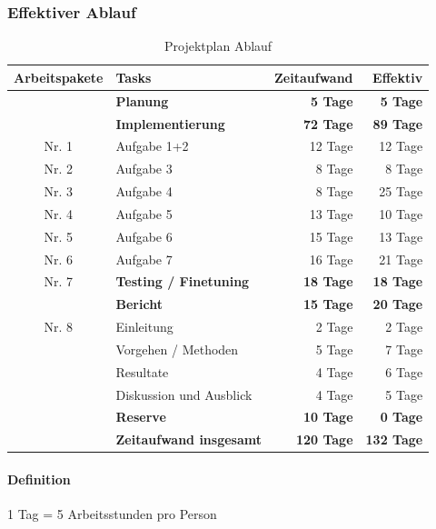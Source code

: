 \documentclass[a4paper,10pt]{article}
\begin{document}
\subsubsection{Effektiver Ablauf}
\begin{table}[h!]
\centering 
  \begin{tabular}{| c | l | r | >{\color{red}} r |}
    \hline
    \rowcolor{hellgrau} 
    \textbf{Arbeitspakete} & \textbf{Tasks} & \textbf{Zeitaufwand} & \textbf{\color{black}Effektiv} \\ \hline \hline
    \multirow{1}{*}{} & \textbf{Planung} & \textbf{ 5 Tage} & \textbf{ 5 Tage}  \\ \cline{2-4} \hline \hline
     & \textbf{Implementierung} & \textbf{ 72 Tage} & \textbf{ 89 Tage}  \\ \hline
     \multirow{1}{*}{Nr. 1}& Aufgabe 1+2 & 12 Tage & 12 Tage \\ \hline
     Nr. 2 & Aufgabe 3 & 8 Tage & 8 Tage \\ \hline
     Nr. 3& Aufgabe 4 & 8 Tage & 25 Tage \\ \hline
     Nr. 4& Aufgabe 5 & 13 Tage & 10 Tage \\ \hline
     Nr. 5& Aufgabe 6 & 15 Tage & 13 Tage \\ \hline
     Nr. 6& Aufgabe 7 & 16 Tage & 21 Tage \\ \cline{2-4}\hline \hline
     Nr. 7& \textbf{Testing / Finetuning} & \textbf{ 18 Tage} & \textbf{ 18 Tage}  \\ \hline \hline
     \multirow{3}{*}{Nr. 8} & \textbf{Bericht} & \textbf{15 Tage} & \textbf{ 20 Tage} \\ \cline{2-4}
     & Einleitung & 2 Tage & 2 Tage  \\ \cline{2-4}
     & Vorgehen / Methoden & 5 Tage & 7 Tage  \\ \cline{2-4}
     & Resultate & 4 Tage & 6 Tage  \\ \cline{2-4}
     & Diskussion und Ausblick & 4 Tage &  5 Tage \\ \cline{2-4} \hline \hline
     & \textbf{Reserve} & \textbf{10 Tage} & \textbf{ 0 Tage} \\ \hline \hline \hline
     & \textbf{Zeitaufwand insgesamt} & \textbf{ 120 Tage}  & \textbf{ 132 Tage} \\ \hline \hline
  \end{tabular}
  \caption{Projektplan Ablauf}
  \label{EffektivPlan}
\end{table}

\paragraph{Definition}
1 Tag = 5 Arbeitsstunden pro Person \\
\end{document}
